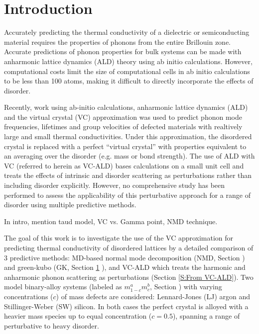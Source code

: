 \documentclass[aps,prb,twocolumn,superscriptaddress,amsmath,amssymb,floatfix]{revtex4}
\begin{document}
\section{\label{S:Introduction}Introduction}

Accurately predicting the thermal conductivity of a dielectric or 
semiconducting material requires the properties of phonons from the entire 
Brillouin zone. Accurate predictions of phonon properties for bulk systems 
can be made with anharmonic lattice dynamics (ALD) theory 
using ab initio 
calculations.\cite{ward_intrinsic_2010,lindsay_thermal_2012,
garg_role_2011,
shiga_microscopic_2012,tian_phonon_2012,
shiomi_thermal_2011,esfarjani_heat_2011}
However, computational costs limit the size of computational cells 
in ab initio calculations to be less than 100 atoms, making it difficult 
to directly incorporate the effects of disorder.
\cite{koker_thermal_2009,bao_first-principles_2012,
lindsay_thermal_2012,tian_phonon_2012,garg_role_2011}

Recently, work using ab-initio calculations, anharmonic 
lattice dynamics (ALD) and the virtual crystal (VC) 
approximation was used to predict phonon mode frequencies, lifetimes and 
group velocities of defected materials with realtively
large\cite{garg_role_2011,lindsay_thermal_2012} 
and 
small\cite{tian_phonon_2012} 
thermal conductivities. 
Under this approximation, the disordered 
crystal is replaced with a perfect “virtual crystal” with properties 
equivalent to an averaging over the disorder (e.g.  mass or bond 
strength).\cite{abeles_lattice_1963}
The use of ALD with VC (referred to herein as VC-ALD) bases 
calculations on a small unit cell and 
treats the effects of intrinsic and disorder scattering as perturbations 
rather than including disorder explicitly.
\cite{abeles_lattice_1963,tamura_isotope_1983,tian_phonon_2012} 
However, no comprehensive study has been performed 
to assess the applicability of this perturbative approach for a range 
of disorder using multiple predictive methods.

In intro, mention taud model, VC vs. Gamma point, NMD technique.

The goal of this work is to investigate the use of the VC 
approximation for predicting thermal conductivity of disordered 
lattices by a detailed comparison 
of 3 predictive methods: MD-based normal mode 
decomposition (NMD, Section ) and green-kubo (GK, Section \ref{} ), 
and VC-ALD which treats the harmonic and 
anharmonic phonon scattering as perturbations 
(Section \ref{S:From VC-ALD}). 
Two model binary-alloy systems 
(labeled as $m^a_{1-c}m^b_{c}$, Section ) 
with varying concentrations ($c$) of mass defects  
are considered: 
Lennard-Jones (LJ) argon and Stillinger-Weber (SW) silicon. 
In both cases the perfect crystal is 
alloyed with a heavier mass species up to equal 
concentration ($c=0.5$), spanning 
a range of perturbative to heavy disorder. 
\end{document}
